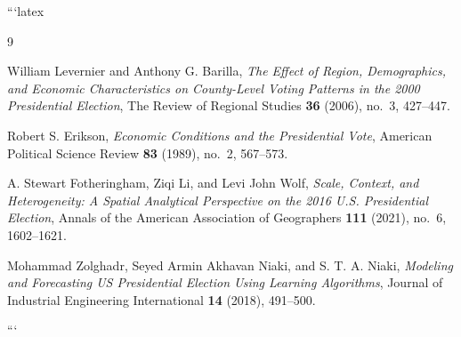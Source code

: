 ```latex
\begin{thebibliography}{9}
	
	William Levernier and Anthony G. Barilla,
	\emph{The Effect of Region, Demographics, and Economic Characteristics on
		County-Level Voting Patterns in the 2000 Presidential Election},
	The Review of Regional Studies \textbf{36} (2006), no.~3, 427--447.
	
	Robert S. Erikson,
	\emph{Economic Conditions and the Presidential Vote},
	American Political Science Review \textbf{83} (1989), no.~2, 567--573.
	
	A. Stewart Fotheringham, Ziqi Li, and Levi John Wolf,
	\emph{Scale, Context, and Heterogeneity: A Spatial Analytical Perspective
		on the 2016 U.S. Presidential Election},
	Annals of the American Association of Geographers
	\textbf{111} (2021), no.~6, 1602--1621.
	
	Mohammad Zolghadr, Seyed Armin Akhavan Niaki, and S. T. A. Niaki,
	\emph{Modeling and Forecasting US Presidential Election Using Learning
		Algorithms},
	Journal of Industrial Engineering International
	\textbf{14} (2018), 491--500.
	
\end{thebibliography}
```
